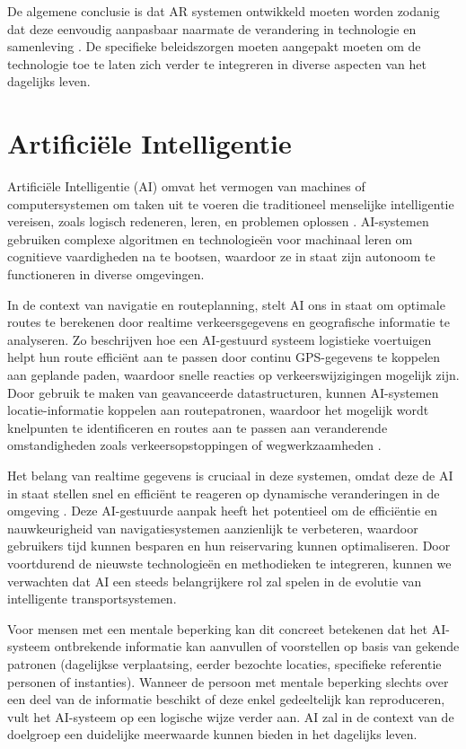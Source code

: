 De algemene conclusie is dat AR systemen ontwikkeld moeten worden zodanig dat deze eenvoudig aanpasbaar naarmate de verandering in technologie en samenleving \autocite{Calo2015}.  De specifieke beleidszorgen moeten aangepakt moeten om de technologie toe te laten zich verder te integreren in diverse aspecten van het dagelijks leven.

\section{Artificiële Intelligentie}
\label{sec:artificiele-intelligentie}

Artificiële Intelligentie (AI) omvat het vermogen van machines of computersystemen om taken uit te voeren die traditioneel menselijke intelligentie vereisen, zoals logisch redeneren, leren, en problemen oplossen \autocite{Sabouret2020}. AI-systemen gebruiken complexe algoritmen en technologieën voor machinaal leren om cognitieve vaardigheden na te bootsen, waardoor ze in staat zijn autonoom te functioneren in diverse omgevingen. 

In de context van navigatie en routeplanning, stelt AI ons in staat om optimale routes te berekenen door realtime verkeersgegevens en geografische informatie te analyseren. Zo beschrijven \textcite{Hu2020} hoe een AI-gestuurd systeem logistieke voertuigen helpt hun route efficiënt aan te passen door continu GPS-gegevens te koppelen aan geplande paden, waardoor snelle reacties op verkeerswijzigingen mogelijk zijn. Door gebruik te maken van geavanceerde datastructuren, kunnen AI-systemen locatie-informatie koppelen aan routepatronen, waardoor het mogelijk wordt knelpunten te identificeren en routes aan te passen aan veranderende omstandigheden zoals verkeersopstoppingen of wegwerkzaamheden \autocite{Soni2023a,Ruta2010}. 

Het belang van realtime gegevens is cruciaal in deze systemen, omdat deze de AI in staat stellen snel en efficiënt te reageren op dynamische veranderingen in de omgeving \autocite{Ciravegna2018}. Deze AI-gestuurde aanpak heeft het potentieel om de efficiëntie en nauwkeurigheid van navigatiesystemen aanzienlijk te verbeteren, waardoor gebruikers tijd kunnen besparen en hun reiservaring kunnen optimaliseren. Door voortdurend de nieuwste technologieën en methodieken te integreren, kunnen we verwachten dat AI een steeds belangrijkere rol zal spelen in de evolutie van intelligente transportsystemen.

Voor mensen met een mentale beperking kan dit concreet betekenen dat het AI-systeem ontbrekende informatie kan aanvullen of voorstellen op basis van gekende patronen (dagelijkse verplaatsing, eerder bezochte locaties, specifieke referentie personen of instanties). Wanneer de persoon met mentale beperking slechts over een deel van de informatie beschikt of deze enkel gedeeltelijk kan reproduceren, vult het AI-systeem op een logische wijze verder aan. AI zal in de context van de doelgroep een duidelijke meerwaarde kunnen bieden in het dagelijks leven.


